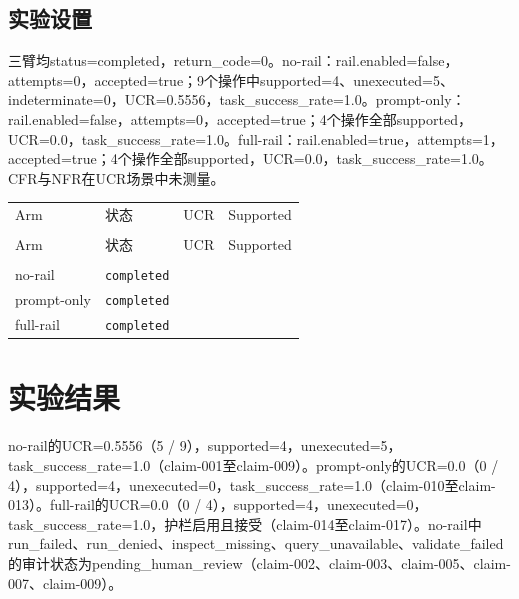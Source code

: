 \documentclass[UTF8]{ctexart}
\begin{document}
\subsection{实验设置}
三臂均status=completed，return\_\allowbreak{}code=0。no-\allowbreak{}rail：rail.enabled=false，attempts=0，accepted=true；9个操作中supported=4、unexecuted=5、indeterminate=0，UCR=0.5556，task\_\allowbreak{}success\_\allowbreak{}rate=1.0。prompt-\allowbreak{}only：rail.enabled=false，attempts=0，accepted=true；4个操作全部supported，UCR=0.0，task\_\allowbreak{}success\_\allowbreak{}rate=1.0。full-\allowbreak{}rail：rail.enabled=true，attempts=1，accepted=true；4个操作全部supported，UCR=0.0，task\_\allowbreak{}success\_\allowbreak{}rate=1.0。CFR与NFR在UCR场景中未测量。
\begin{longtable}{@{}>{\raggedright\arraybackslash}p{}>{\raggedright\arraybackslash}p{}>{\raggedleft\arraybackslash}p{}>{\raggedleft\arraybackslash}p{}@{}}
\toprule
Arm & 状态 & UCR & Supported\\\\
\midrule
\endfirsthead
\toprule
Arm & 状态 & UCR & Supported\\\\
\midrule
\endhead
no-\allowbreak{}rail & \texttt{\scriptsize completed} & 0.5556 & 4 \\
prompt-\allowbreak{}only & \texttt{\scriptsize completed} & 0.0 & 4 \\
full-\allowbreak{}rail & \texttt{\scriptsize completed} & 0.0 & 4 \\
\bottomrule
\end{longtable}
\section{实验结果}
no-\allowbreak{}rail的UCR=0.5556（5 / 9），supported=4，unexecuted=5，task\_\allowbreak{}success\_\allowbreak{}rate=1.0（claim-\allowbreak{}001至claim-\allowbreak{}009）。prompt-\allowbreak{}only的UCR=0.0（0 / 4），supported=4，unexecuted=0，task\_\allowbreak{}success\_\allowbreak{}rate=1.0（claim-\allowbreak{}010至claim-\allowbreak{}013）。full-\allowbreak{}rail的UCR=0.0（0 / 4），supported=4，unexecuted=0，task\_\allowbreak{}success\_\allowbreak{}rate=1.0，护栏启用且接受（claim-\allowbreak{}014至claim-\allowbreak{}017）。no-\allowbreak{}rail中run\_\allowbreak{}failed、run\_\allowbreak{}denied、inspect\_\allowbreak{}missing、query\_\allowbreak{}unavailable、validate\_\allowbreak{}failed的审计状态为pending\_\allowbreak{}human\_\allowbreak{}review（claim-\allowbreak{}002、claim-\allowbreak{}003、claim-\allowbreak{}005、claim-\allowbreak{}007、claim-\allowbreak{}009）。
\end{document}
